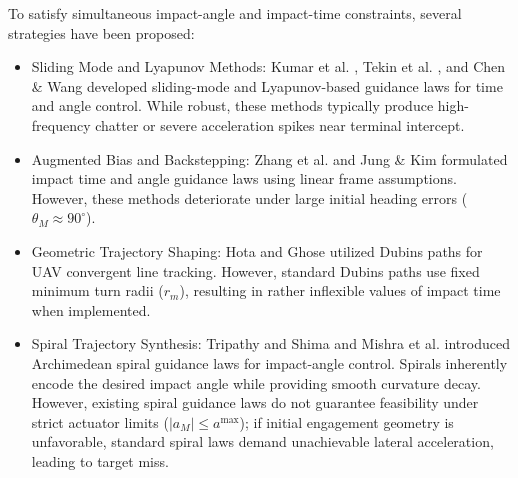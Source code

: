 To satisfy simultaneous impact-angle and impact-time constraints, several strategies have been proposed:
\begin{itemize}
    \item Sliding Mode and Lyapunov Methods: Kumar et al. \cite{kumar2012sliding}, Tekin et al. \cite{Tekin2016_IT}, and Chen \& Wang \cite{Chen2018JGCD} developed sliding-mode and Lyapunov-based guidance laws for time and angle control. While robust, these methods typically produce high-frequency chatter or severe acceleration spikes near terminal intercept.
    \item Augmented Bias and Backstepping: Zhang et al. \cite{zhang2013terminal, Zhang2015} and Jung \& Kim \cite{Jung2006} formulated impact time and angle guidance laws using linear frame assumptions. However, these methods deteriorate under large initial heading errors ($\theta_M \approx 90^\circ$).
    \item Geometric Trajectory Shaping: Hota and Ghose \cite{hota2009modified} utilized Dubins paths for UAV convergent line tracking. However, standard Dubins paths use fixed minimum turn radii ($r_m$), resulting in rather inflexible values of impact time when implemented.
    \item Spiral Trajectory Synthesis: Tripathy and Shima \cite{tripathy2019archimedean} and Mishra et al. \cite{mishra2024spiral} introduced Archimedean spiral guidance laws for impact-angle control. Spirals inherently encode the desired impact angle while providing smooth curvature decay. However, existing spiral guidance laws do not guarantee feasibility under strict actuator limits ($|a_M| \le a^{\text{max}}$); if initial engagement geometry is unfavorable, standard spiral laws demand unachievable lateral acceleration, leading to target miss.
\end{itemize}


